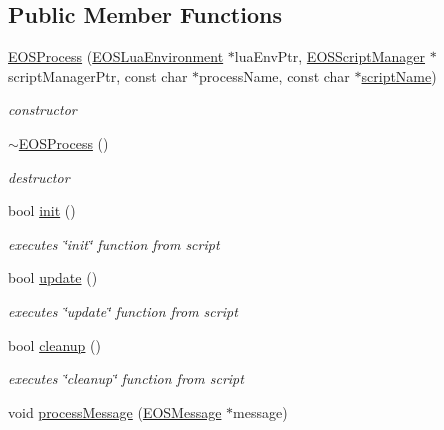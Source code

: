 \subsection*{Public Member Functions}
\begin{CompactItemize}
\item 
\hyperlink{classEOSProcess_7c1ceeba22b5a334c0f95e32facddbea}{EOSProcess} (\hyperlink{classEOSLuaEnvironment}{EOSLuaEnvironment} $\ast$luaEnvPtr, \hyperlink{classEOSScriptManager}{EOSScriptManager} $\ast$scriptManagerPtr, const char $\ast$processName, const char $\ast$\hyperlink{classEOSLuaScript_7ca6cc5f26c5cfad510e9391e5815d8c}{scriptName})
\begin{CompactList}\small\item\em constructor \item\end{CompactList}\item 
\hyperlink{classEOSProcess_4204e2edd0f82d46409d37cbf309c8c6}{$\sim$EOSProcess} ()
\begin{CompactList}\small\item\em destructor \item\end{CompactList}\item 
bool \hyperlink{classEOSProcess_e595b8a353aac17d1ded7811d137a0ca}{init} ()
\begin{CompactList}\small\item\em executes \char`\"{}init\char`\"{} function from script \item\end{CompactList}\item 
bool \hyperlink{classEOSProcess_c141df99c0216969bc8b6b463f12b924}{update} ()
\begin{CompactList}\small\item\em executes \char`\"{}update\char`\"{} function from script \item\end{CompactList}\item 
bool \hyperlink{classEOSProcess_224e00ab735c33b4c5a4e58b9fe1826c}{cleanup} ()
\begin{CompactList}\small\item\em executes \char`\"{}cleanup\char`\"{} function from script \item\end{CompactList}\item 
void \hyperlink{classEOSProcess_bdaf60e60530702981c1d4ac5ceb4c3e}{processMessage} (\hyperlink{classEOSMessage}{EOSMessage} $\ast$message)

\end{CompactItemize}
